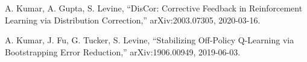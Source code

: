 \documentclass[
 reprint,
 amsmath,amssymb,amsfonts,clevref,
 aps,
prstab,
]{revtex4-2}
\begin{document}
\begin{thebibliography}{9}
 A. Kumar, A. Gupta, S. Levine, “DisCor: Corrective Feedback in Reinforcement Learning via Distribution Correction,” arXiv:2003.07305, 2020-03-16.

 A. Kumar, J. Fu, G. Tucker, S. Levine, “Stabilizing Off-Policy Q-Learning via Bootstrapping Error Reduction,” arXiv:1906.00949, 2019-06-03.




\end{thebibliography}

\newpage{\pagestyle{empty}\cleardoublepage}
\end{document}
